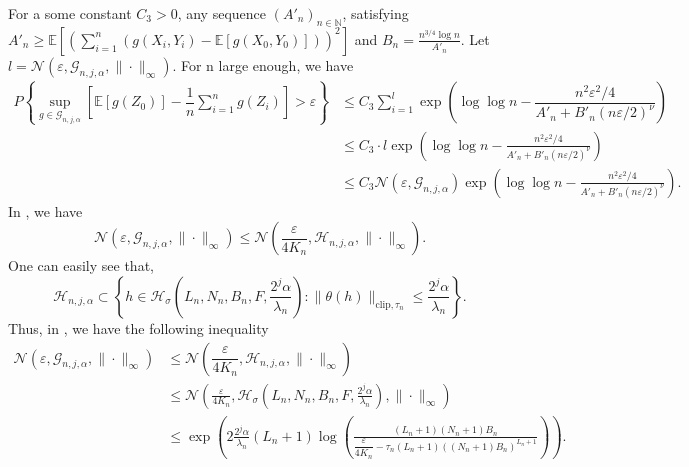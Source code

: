 \documentclass[10pt,twoside]{article}
\numberwithin{equation}{section}
\newcommand{\E}{\ensuremath{\mathbb{E}}}
\newcommand{\N}{\ensuremath{\mathbb{N}}}
\begin{document}
%
For a some  constant $C_3 > 0$, any sequence $ (A'_n)_ {n \in \N} $, satisfying   $A'_n \ge \E \left[\left(\sum_{i=1}^n \left(g (X_i, Y_i) - \E [g (X_0, Y_0)] \right) \right) ^2 \right]$ and $ B_n = \frac{n^ {3/4} \log n}{A'_n} $.  Let $l = \mathcal{N}( \varepsilon, \mathcal{G}_ {n, j, \alpha}, \| \cdot \|_\infty) $.  For n large enough, we have 
%
\begin{align}\label{equ_br}
P\left\{\underset{ g \in \mathcal{G}_{n, j, \alpha}}{\sup} \left[ \E[g(Z_0)] - \dfrac{1}{n} \sum_{i=1}^n g(Z_i) \right] > \varepsilon \right\} 
\nonumber & \leq  C_{3} \sum_{i=1}^l \exp\left(\log \log n -\dfrac{n^2 \varepsilon^2/4}{A'_n  +  B'_n (n \varepsilon/2)^\nu} \right)   
\\
\nonumber & \leq C_{3}\cdot l \exp\left(\log \log n -\frac{n^2 \varepsilon^2/4}{A'_n  +  B'_n (n \varepsilon/2)^\nu} \right)
\\
\nonumber & \leq C_{3}\mathcal{N}(\varepsilon, \mathcal{G}_{n, j, \alpha}) \exp\left(\log \log n - \frac{n^2 \varepsilon^2/4}{A'_n + B'_n (n \varepsilon/2)^\nu} \right).
\end{align}
%
 In \cite{ohn2022nonconvex}, we have  
% 
\begin{equation}\label{P_inqu2}
\mathcal{N}(\varepsilon, \mathcal{G}_{n, j, \alpha}, \| \cdot \|_\infty) \leq \mathcal{N} (\frac{\varepsilon}{4 K_n}, \mathcal{H}_{n, j, \alpha}, \| \cdot \|_\infty).
\end{equation} 
%
% 
One can easily see that,
%
\begin{equation}\label{inclusion}
 \mathcal{H}_{n, j, \alpha}  \subset \left\{  h \in \mathcal{H}_{\sigma}(L_{n}, N_{n}, B_{n}, F, \dfrac{2^j \alpha}{\lambda_n}): \| \theta(h) \|_{ \text{clip}, \tau_n} \leq \frac{2^j \alpha}{\lambda_n}  \right\}. 
 \end{equation}
%
Thus, in \cite{ohn2022nonconvex}, we have the following inequality
%
\begin{align}\label{cover_number}
\mathcal{N}(\varepsilon, \mathcal{G}_{n, j, \alpha}, \| \cdot \|_\infty)  \nonumber & \leq \mathcal{N}(\dfrac{\varepsilon}{4 K_n}, \mathcal{H}_{n, j, \alpha}, \| \cdot \|_\infty) 
\\
\nonumber & \leq \mathcal{N}(\frac{\varepsilon}{4 K_n}, \mathcal{H}_{\sigma}(L_{n},N_{n}, B_{n}, F, \frac{2^j \alpha}{\lambda_n}),  \| \cdot \|_\infty )
\\
& \leq  \exp\left(2 \frac{2^j \alpha}{\lambda_n}(L_n + 1) \log \left(\frac{(L_n + 1)(N_n + 1)B_n}{\dfrac{\varepsilon}{4K_n} - \tau_n (L_n + 1)((N_n + 1) B_n)^{L_n +1}} \right) \right).
\end{align} 
\end{document}
